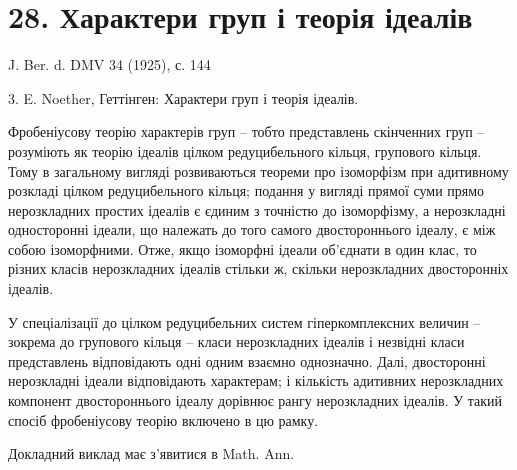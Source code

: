 \documentclass[11pt]{article}
\begin{document}
\section*{28. Характери груп і теорія ідеалів}

\begin{center}
J. Ber. d. DMV 34 (1925), с. 144
\end{center}

3. E. Noether, Геттінген: Характери груп і теорія ідеалів.

Фробеніусову теорію характерів груп -- тобто представлень скінченних груп -- розуміють як теорію ідеалів цілком редуцибельного кільця, групового кільця. Тому в загальному вигляді розвиваються теореми про ізоморфізм при адитивному розкладі цілком редуцибельного кільця; подання у вигляді прямої суми прямо нерозкладних простих ідеалів є єдиним з точністю до ізоморфізму, а нерозкладні односторонні ідеали, що належать до того самого двостороннього ідеалу, є між собою ізоморфними. Отже, якщо ізоморфні ідеали об'єднати в один клас, то різних класів нерозкладних ідеалів стільки ж, скільки нерозкладних двосторонніх ідеалів.

У спеціалізації до цілком редуцибельних систем гіперкомплексних величин -- зокрема до групового кільця -- класи нерозкладних ідеалів і незвідні класи представлень відповідають одні одним взаємно однозначно. Далі, двосторонні нерозкладні ідеали відповідають характерам; і кількість адитивних нерозкладних компонент двостороннього ідеалу дорівнює рангу нерозкладних ідеалів. У такий спосіб фробеніусову теорію включено в цю рамку.

Докладний виклад має з'явитися в Math. Ann.
\end{document}

